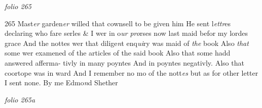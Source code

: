 \documentclass[12pt, a4paper]{book}
\begin{document}
\dotfill
					

\textit{folio 265}


{\color{Mahogany}265} 
				\marginpar[\vspace{0.5cm}{\textcolor{Gray}{32}}]{}
			 Mast\textit{er} garden\textit{er} willed that cownsell to be given him 
				\marginpar[\vspace{0.5cm}{\textcolor{Gray}{33 34}}]{}
			 He sent l\textit{ettr}es declaring who fare serles \& I wer in o\textit{ur}
               \textit{pro}rses now last maid befor my lordes grace And the nottes wer that dilige\textit{n}t enq\textit{ui}ry was maid of \textit{the} book Also \textit{that} some wer examened of the articles of the said book Also that some hadd answered afferma- tivly in many poyntes And in poyntes negativly. Also  that coortope was in ward And I remember no mo of the nott\textit{es} but as for other letter I sent none.  By me Edmo\textit{n}d Shether

\dotfill
					

\textit{folio 265a}
\end{document}
